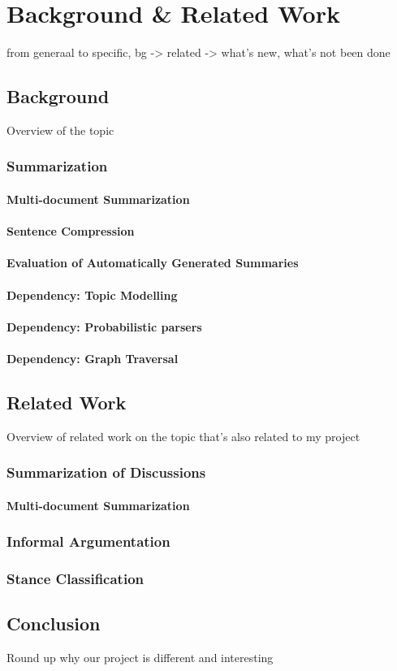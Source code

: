 \chapter{Background \& Related Work\label{chap:background-related}}
  from generaal to specific, bg -> related -> what's new, what's not been done
  \section{Background}
    Overview of the topic
    \subsection{Summarization}
    \subsubsection{Multi-document Summarization}
    \subsubsection{Sentence Compression}
    \subsubsection{Evaluation of Automatically Generated Summaries}
    \subsubsection{Dependency: Topic Modelling}
    \subsubsection{Dependency: Probabilistic parsers}
    \subsubsection{Dependency: Graph Traversal}
  \section{Related Work}
    Overview of related work on the topic that's also related to my project
    \subsection{Summarization of Discussions}
    \subsubsection{Multi-document Summarization}
    \subsection{Informal Argumentation}
    \subsection{Stance Classification}
  \section{Conclusion}
    Round up why our project is different and interesting
